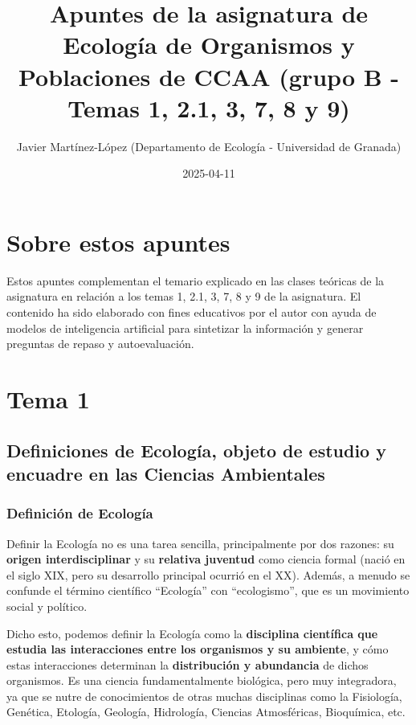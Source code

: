 \documentclass[
]{book}
\title{Apuntes de la asignatura de Ecología de Organismos y Poblaciones de CCAA (grupo B - Temas 1, 2.1, 3, 7, 8 y 9)}
\author{Javier Martínez-López (Departamento de Ecología - Universidad de Granada)}
\date{2025-04-11}
\begin{document}
\maketitle

{
\setcounter{tocdepth}{1}
\tableofcontents
}
\chapter*{Sobre estos apuntes}\label{intro}

Estos apuntes complementan el temario explicado en las clases teóricas de la asignatura en relación a los temas 1, 2.1, 3, 7, 8 y 9 de la asignatura. El contenido ha sido elaborado con fines educativos por el autor con ayuda de modelos de inteligencia artificial para sintetizar la información y generar preguntas de repaso y autoevaluación.

\chapter*{Tema 1}\label{tema1}

\section*{Definiciones de Ecología, objeto de estudio y encuadre en las Ciencias Ambientales}\label{ecointro}

\subsection*{Definición de Ecología}\label{ecologia}

Definir la Ecología no es una tarea sencilla, principalmente por dos razones: su \textbf{origen interdisciplinar} y su \textbf{relativa juventud} como ciencia formal (nació en el siglo XIX, pero su desarrollo principal ocurrió en el XX). Además, a menudo se confunde el término científico ``Ecología'' con ``ecologismo'', que es un movimiento social y político.

Dicho esto, podemos definir la Ecología como la \textbf{disciplina científica que estudia las interacciones entre los organismos y su ambiente}, y cómo estas interacciones determinan la \textbf{distribución y abundancia} de dichos organismos. Es una ciencia fundamentalmente biológica, pero muy integradora, ya que se nutre de conocimientos de otras muchas disciplinas como la Fisiología, Genética, Etología, Geología, Hidrología, Ciencias Atmosféricas, Bioquímica, etc.
\end{document}
